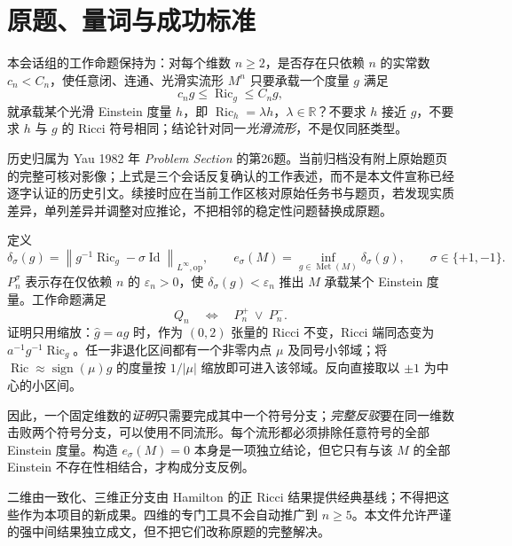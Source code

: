 \documentclass[UTF8,a4paper,11pt,fontset=fandol]{ctexart}
\numberwithin{equation}{section}
\theoremstyle{definition}
\newcommand{\Ric}{\operatorname{Ric}}
\newcommand{\Met}{\operatorname{Met}}
\newcommand{\Id}{\operatorname{Id}}
\newcommand{\op}{\mathrm{op}}
\newcommand{\R}{\mathbb R}
\newcommand{\norm}[1]{\left\lVert#1\right\rVert}
\begin{document}
\section{原题、量词与成功标准}
本会话组的工作命题保持为：对每个维数 $n\ge2$，是否存在只依赖 $n$ 的实常数 $c_n<C_n$，使任意闭、连通、光滑实流形 $M^n$ 只要承载一个度量 $g$ 满足
\begin{equation}\label{eq:Q}
 c_ng\le\Ric_g\le C_ng,
\end{equation}
就承载某个光滑 Einstein 度量 $h$，即 $\Ric_h=\lambda h$，$\lambda\in\R$？不要求 $h$ 接近 $g$，不要求 $h$ 与 $g$ 的 Ricci 符号相同；结论针对同一\emph{光滑流形}，不是仅同胚类型。

历史归属为 Yau 1982 年 \emph{Problem Section} 的第26题\cite{Yau1982}。当前归档没有附上原始题页的完整可核对影像；上式是三个会话反复确认的工作表述，而不是本文件宣称已经逐字认证的历史引文。续接时应在当前工作区核对原始任务书与题页，若发现实质差异，单列差异并调整对应推论，不把相邻的稳定性问题替换成原题。

定义
\begin{equation}\label{eq:defect}
 \delta_\sigma(g)=\norm{g^{-1}\Ric_g-\sigma\Id}_{L^\infty,\op},\qquad
 e_\sigma(M)=\inf_{g\in\Met(M)}\delta_\sigma(g),\qquad \sigma\in\{+1,-1\}.
\end{equation}
$P_n^\sigma$ 表示存在仅依赖 $n$ 的 $\varepsilon_n>0$，使 $\delta_\sigma(g)<\varepsilon_n$ 推出 $M$ 承载某个 Einstein 度量。工作命题满足
\begin{equation}\label{eq:branches}
 Q_n\quad\Longleftrightarrow\quad P_n^+\ \lor\ P_n^-.
\end{equation}
证明只用缩放：$\widehat g=ag$ 时，作为 $(0,2)$ 张量的 Ricci 不变，Ricci 端同态变为 $a^{-1}g^{-1}\Ric_g$。任一非退化区间都有一个非零内点 $\mu$ 及同号小邻域；将 $\Ric\approx\operatorname{sign}(\mu)g$ 的度量按 $1/|\mu|$ 缩放即可进入该邻域。反向直接取以 $\pm1$ 为中心的小区间。

因此，一个固定维数的\emph{证明}只需要完成其中一个符号分支；\emph{完整反驳}要在同一维数击败两个符号分支，可以使用不同流形。每个流形都必须排除任意符号的全部 Einstein 度量。构造 $e_\sigma(M)=0$ 本身是一项独立结论，但它只有与该 $M$ 的全部 Einstein 不存在性相结合，才构成分支反例。

二维由一致化、三维正分支由 Hamilton 的正 Ricci 结果提供经典基线；不得把这些作为本项目的新成果。四维的专门工具不会自动推广到 $n\ge5$。本文件允许严谨的强中间结果独立成文，但不把它们改称原题的完整解决。
\end{document}
